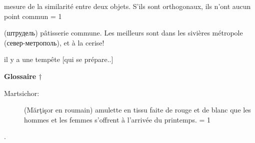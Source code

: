 {{\begin{description}
        \fi
        \item[Orthogonalité (Mathématiques):]
        mesure de la \og{}similarité\fg{} entre deux objets.
        S'ils sont \og{}orthogonaux\fg{}, ils n'ont aucun point commun 
        \ifnum \isPayant = 1 
            \item[Shtroudel (Russe):] (штрудель) pâtisserie commune. Les meilleurs sont dans les
            sivières métropole (север-метрополь), et à la cerise!
        \fi
        \item[Toufann var (Azerbaïdjanais)] \og{}il y a une tempête\fg{} [qui se prépare..]
    \end{description}
}{
    \textbf{\large Glossaire $\dagger$}
    \begin{description}
        \item[Martsichor:] (Mărţişor en roumain) amulette en tissu faite de rouge
        et de blanc que les hommes et les femmes s'offrent à l'arrivée du printemps.
        \ifnum \isPayant = 1 
            \item[.] 
        \fi
    \end{description}
}}

\newpage


